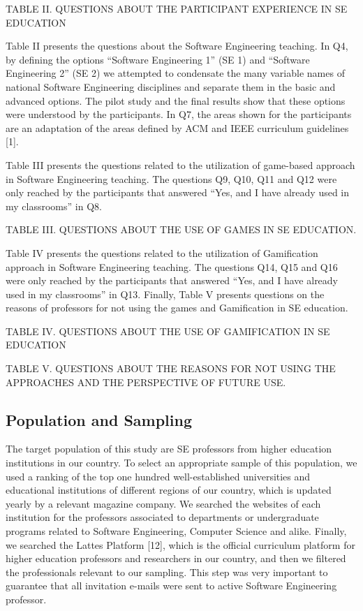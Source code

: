TABLE II. QUESTIONS ABOUT THE PARTICIPANT EXPERIENCE IN SE EDUCATION


Table II presents the questions about the Software Engineering teaching. In Q4, by defining the options “Software Engineering 1” (SE 1) and “Software Engineering 2” (SE 2) we attempted to condensate the many variable names of national Software Engineering disciplines and separate them in the basic and advanced options. The pilot study and the final results show that these options were understood by the participants. In Q7, the areas shown for the participants are an adaptation of the areas defined by ACM and IEEE curriculum guidelines [1].

Table III presents the questions related to the utilization of game-based approach in Software Engineering teaching. The questions Q9, Q10, Q11 and Q12 were only reached by the participants that answered “Yes, and I have already used in my classrooms” in Q8.

TABLE III. QUESTIONS ABOUT THE USE OF GAMES IN SE EDUCATION.


Table IV presents the questions related to the utilization of Gamification approach in Software Engineering teaching. The questions Q14, Q15 and Q16 were only reached by the participants that answered “Yes, and I have already used in my classrooms” in Q13.
Finally, Table V presents questions on the reasons of professors for not using the games and Gamification in SE education.


TABLE IV. QUESTIONS ABOUT THE USE OF GAMIFICATION IN SE EDUCATION

TABLE V. QUESTIONS ABOUT THE REASONS FOR NOT USING THE APPROACHES AND THE PERSPECTIVE OF FUTURE USE.

\subsection{Population and Sampling}
\label{sec:population}

The target population of this study are SE professors from higher education institutions in our country. To select an appropriate sample of this population, we used a ranking of the top one hundred well-established universities and educational institutions of different regions of our country, which is updated yearly by a relevant magazine company. We searched the websites of each institution for the professors associated to departments or undergraduate programs related to Software Engineering, Computer Science and alike. Finally, we searched the Lattes Platform [12], which is the official curriculum platform for higher education professors and researchers in our country, and then we filtered the professionals relevant to our sampling. This step was very important to guarantee that all invitation e-mails were sent to active Software Engineering professor.

